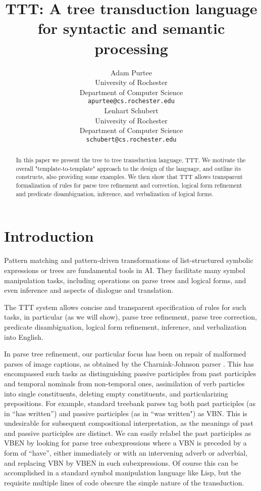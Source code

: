 \documentclass[a4,11pt]{article}
\title{TTT: A tree transduction language for syntactic and semantic processing}
\author{Adam Purtee\\
  University of Rochester \\
  Department of Computer Science \\
  {\tt apurtee@cs.rochester.edu} \\\And
  Lenhart Schubert\\
  University of Rochester\\
  Department of Computer Science\\
  {\tt schubert@cs.rochester.edu} \\}
\date{}
\begin{document}
\maketitle
\begin{abstract}
In this paper we present the tree to tree transduction language, TTT. We
motivate the overall "template-to-template" approach to the design of 
the language, and outline its constructs, also providing some examples. 
We then show that TTT allows transparent formalization of rules for
parse tree refinement and correction, logical form refinement and 
predicate disambiguation, inference, and verbalization of logical forms. 

\end{abstract}

\section{Introduction}
Pattern matching and pattern-driven transformations of list-structured symbolic expressions or trees are fundamental tools in AI.  They facilitate many symbol manipulation tasks, including operations on parse trees and logical forms, and even inference and aspects of dialogue and translation.

The TTT system allows concise and transparent specification of rules for such tasks, in particular (as we will show), parse tree refinement, parse tree correction, predicate disambiguation, logical form refinement, inference, and verbalization into English. 

In parse tree refinement, our particular focus has been on repair of malformed parses of image captions, as obtained by the Charniak-Johnson parser \cite{Charniak-Johnson:2005}. This has encompassed such tasks as distinguishing passive participles from past participles and temporal nominals from non-temporal ones, assimilation of verb particles into single constituents, deleting empty constituents, and particularizing prepositions. For example, standard treebank parses tag both past participles (as in ``has written'') and passive participles (as in ``was written") as VBN. This is undesirable for subsequent compositional interpretation, as the meanings of past and passive participles are distinct. We can easily relabel the past participles as VBEN by looking for parse tree subexpressions where a VBN is preceded by a form of ``have'', either immediately or with an intervening adverb or adverbial, and replacing VBN by VBEN in such subexpressions. Of course this can be accomplished in a standard symbol manipulation language like Lisp, but the requisite multiple lines of code obscure the simple nature of the transduction.
\end{document}
